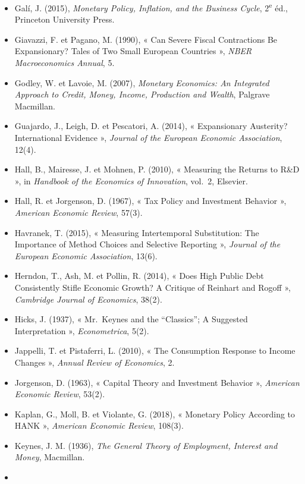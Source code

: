 \documentclass[
  11pt,
  11pt,
  a4paper,
  openany]{book}
\begin{document}
\begin{itemize}
  Taxes Reduce Wages? Micro Evidence from Germany », \emph{American
  Economic Review}, 108(2).
\item
  Galí, J. (2015), \emph{Monetary Policy, Inflation, and the Business
  Cycle}, 2\textsuperscript{e} éd., Princeton University Press.
\item
  Giavazzi, F. et Pagano, M. (1990), « Can Severe Fiscal Contractions Be
  Expansionary? Tales of Two Small European Countries », \emph{NBER
  Macroeconomics Annual}, 5.
\item
  Godley, W. et Lavoie, M. (2007), \emph{Monetary Economics: An
  Integrated Approach to Credit, Money, Income, Production and Wealth},
  Palgrave Macmillan.
\item
  Guajardo, J., Leigh, D. et Pescatori, A. (2014), « Expansionary
  Austerity? International Evidence », \emph{Journal of the European
  Economic Association}, 12(4).
\item
  Hall, B., Mairesse, J. et Mohnen, P. (2010), « Measuring the Returns
  to R\&D », in \emph{Handbook of the Economics of Innovation}, vol.~2,
  Elsevier.
\item
  Hall, R. et Jorgenson, D. (1967), « Tax Policy and Investment Behavior
  », \emph{American Economic Review}, 57(3).
\item
  Havranek, T. (2015), « Measuring Intertemporal Substitution: The
  Importance of Method Choices and Selective Reporting », \emph{Journal
  of the European Economic Association}, 13(6).
\item
  Herndon, T., Ash, M. et Pollin, R. (2014), « Does High Public Debt
  Consistently Stifle Economic Growth? A Critique of Reinhart and Rogoff
  », \emph{Cambridge Journal of Economics}, 38(2).
\item
  Hicks, J. (1937), « Mr.~Keynes and the ``Classics''; A Suggested
  Interpretation », \emph{Econometrica}, 5(2).
\item
  Jappelli, T. et Pistaferri, L. (2010), « The Consumption Response to
  Income Changes », \emph{Annual Review of Economics}, 2.
\item
  Jorgenson, D. (1963), « Capital Theory and Investment Behavior »,
  \emph{American Economic Review}, 53(2).
\item
  Kaplan, G., Moll, B. et Violante, G. (2018), « Monetary Policy
  According to HANK », \emph{American Economic Review}, 108(3).
\item
  Keynes, J. M. (1936), \emph{The General Theory of Employment, Interest
  and Money}, Macmillan.
\item

\end{itemize}
\end{document}
